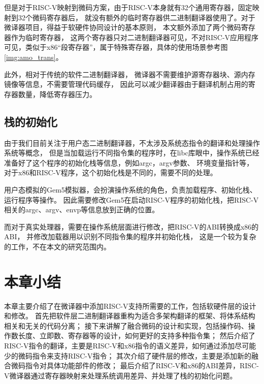 但是对于RISC-V映射到微码方案，由于RISC-V本身就有32个通用寄存器，固定映射到32个微码寄存器后，
就没有额外的临时寄存器供二进制翻译器使用了。对于微译器项目，得益于软硬件协同设计的基本原则，
本文额外添加了两个微码寄存器作为临时寄存器，
这两个寄存器只对二进制翻译器可见，不对RISC-V应用程序可见，类似于x86“段寄存器”，属于特殊寄存器，具体的使用场景参考图\ref{img:amo_trans}。

此外，相对于传统的软件二进制翻译器，
微译器不需要维护源寄存器块、源内存镜像等信息，不需要管理代码缓存，
因此可以减少翻译器由于翻译机制占用的寄存器数量，降低寄存器压力。


\subsection{栈的初始化}
由于我们目前关注于用户态二进制翻译器，不太涉及系统态指令的翻译和处理操作系统等概念，
但是当加载运行不同指令集的程序时，在libc库眼中，操作系统已经准备好了这个程序的初始化栈等信息，例如argc，argv参数、
环境变量指针等，对于x86和RISC-V程序，这个初始化栈是不同的，需要不同的处理。

用户态模拟的Gem5模拟器，会扮演操作系统的角色，负责加载程序、初始化栈、运行程序等操作。
因此需要修改Gem5在启动RISC-V程序的初始化栈，把RISC-V相关的argc、argv、envp等信息放到正确的位置。

而对于真实处理器，需要在操作系统层面进行修改，把RISC-V的ABI转换成x86的ABI，
并修改加载器用以识别不同指令集的程序并初始化栈，
这是一个较为复杂的工作，不在本文的研究范围内。

\section{本章小结}

本章主要介绍了在微译器中添加RISC-V支持所需要的工作，包括软硬件层的设计和修改。
首先把软件层二进制翻译器重构为适合多架构翻译的框架、将体系结构相关和无关的代码分离；
接下来讲解了融合微码的设计和实现，包括操作码、操作数长度、立即数、寄存器等的设计，如何更好的支持多种指令集；
然后介绍了RISC-V指令的翻译，主要是RISC-V和x86指令的语义差异，如何通过添加尽可能少的微码指令来支持RISC-V指令；
其次介绍了硬件层的修改，主要是添加新的融合微码指令对具体功能部件的修改；
最后介绍了RISC-V和x86的ABI差异，RISC-V微译器通过寄存器映射来处理系统调用差异、并处理了栈的初始化问题。